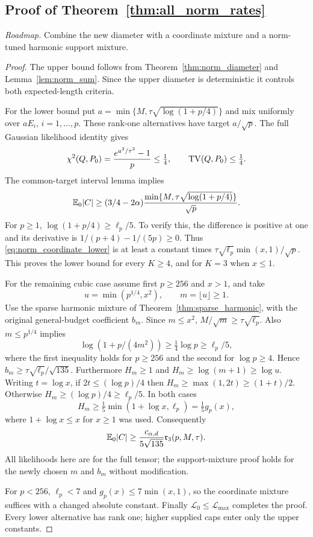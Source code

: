 \subsection{Proof of Theorem~\ref{thm:all_norm_rates}}
\noindent\emph{Roadmap.} Combine the new diameter with a coordinate mixture and a norm-tuned harmonic support mixture.
\begin{proof}
The upper bound follows from Theorem~\ref{thm:norm_diameter} and Lemma~\ref{lem:norm_sum}. Since the upper diameter is deterministic it controls both expected-length criteria.

For the lower bound put $a=\min\{M,\tau\sqrt{\log(1+p/4)}\}$ and mix uniformly over $aE_i$, $i=1,\ldots,p$. These rank-one alternatives have target $a/\sqrt p$. The full Gaussian likelihood identity gives
\[
 \chi^2(Q,P_0)=\frac{e^{a^2/\tau^2}-1}{p}\le\tfrac14,
 \qquad\operatorname{TV}(Q,P_0)\le\tfrac14.
\]
The common-target interval lemma implies
\begin{equation}\label{eq:norm_coordinate_lower}
 \mathbb E_0|C|\ge(3/4-2\alpha)\frac{\min\{M,\tau\sqrt{\log(1+p/4)}\}}{\sqrt p}.
\end{equation}
For $p\ge1$, $\log(1+p/4)\ge\ell_p/5$. To verify this, the difference is positive at one and its derivative is
$1/(p+4)-1/(5p)\ge0$. Thus \eqref{eq:norm_coordinate_lower} is at least a constant times
$\tau\sqrt{\ell_p}\min(x,1)/\sqrt p$. This proves the lower bound for every $K\ge4$, and for $K=3$ when $x\le1$.

For the remaining cubic case assume first $p\ge256$ and $x>1$, and take
\[
 u=\min(p^{1/4},x^2),\qquad m=\lfloor u\rfloor\ge1.
\]
Use the sparse harmonic mixture of Theorem~\ref{thm:sparse_harmonic}, with the original general-budget coefficient $b_m$. Since $m\le x^2$,
$M/\sqrt m\ge\tau\sqrt{\ell_p}$. Also $m\le p^{1/4}$ implies
\[
 \log(1+p/(4m^2))\ge\tfrac14\log p\ge\ell_p/5,
\]
where the first inequality holds for $p\ge256$ and the second for $\log p\ge4$. Hence
$b_m\ge\tau\sqrt{\ell_p}/\sqrt{135}$.
Furthermore $H_m\ge1$ and $H_m\ge\log(m+1)\ge\log u$.
Writing $t=\log x$, if $2t\le(\log p)/4$ then
$H_m\ge\max(1,2t)\ge(1+t)/2$. Otherwise
$H_m\ge(\log p)/4\ge\ell_p/5$.
In both cases
\[
 H_m\ge\tfrac15\min(1+\log x,\ell_p)
       =\tfrac15 g_p(x),
\]
where $1+\log x\le x$ for $x\ge1$ was used. Consequently
\begin{equation}\label{eq:norm_cubic_lower}
 \mathbb E_0|C|\ge\frac{c_{\alpha,d}}{5\sqrt{135}}
            \mathfrak r_3(p,M,\tau).
\end{equation}
All likelihoods here are for the full tensor; the support-mixture proof holds for the newly chosen $m$ and $b_m$ without modification.

For $p<256$, $\ell_p<7$ and $g_p(x)\le7\min(x,1)$, so the coordinate mixture suffices with a changed absolute constant. Finally $\mathcal L_0\le\mathcal L_{\max}$ completes the proof. Every lower alternative has rank one; higher supplied caps enter only the upper constants.
\end{proof}

